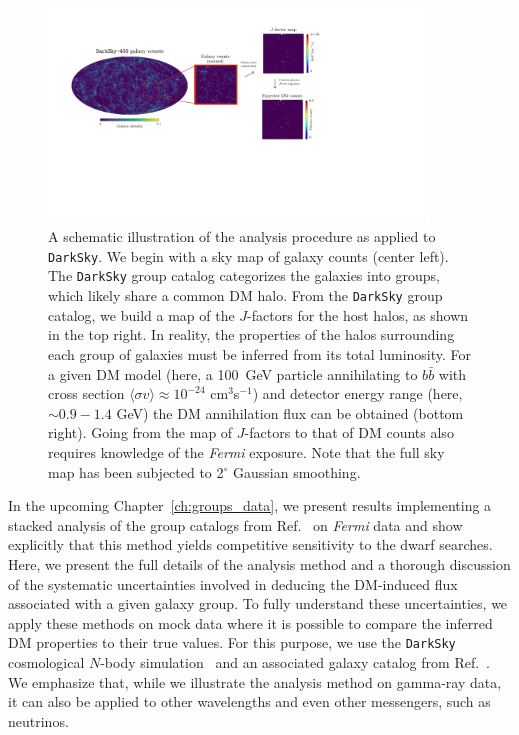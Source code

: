 \begin{figure}[htbp]
   \centering
   \includegraphics[width=0.9\textwidth]{ch-darksky/plots//DarkSky-galaxies.pdf}
   \caption{A schematic illustration of the analysis procedure as applied to \texttt{DarkSky}.   We begin with a sky map of galaxy counts (center left).  The \texttt{DarkSky} group catalog categorizes the galaxies into groups, which likely share a common DM halo.  From the \texttt{DarkSky} group catalog, we build a map of the $J$-factors for the host halos, as shown in the top right.  In reality, the properties of the halos surrounding each group of galaxies must be inferred from its total luminosity.  For a given DM model (here, a 100~GeV particle annihilating to $b\bar{b}$ with cross section $\langle \sigma v \rangle \approx 10^{-24}$ cm$^3$s$^{-1}$) and detector energy range (here, $\sim0.9-1.4$ GeV) the DM annihilation flux can be obtained (bottom right).  Going from the map of $J$-factors to that of DM counts also requires knowledge of the \emph{Fermi} exposure. Note that the full sky map has been subjected to 2$^{\circ}$ Gaussian smoothing.}
   \label{fig:DarkSkycounts}
\end{figure}

In the upcoming Chapter~\ref{ch:groups_data}, we present results implementing a stacked analysis of the group catalogs from Ref.~\cite{Tully:2015opa,2017ApJ...843...16K} on \emph{Fermi} data and show explicitly that this method yields competitive sensitivity to the dwarf searches.  Here, we present the full details of the analysis method and a thorough discussion of the systematic uncertainties involved in deducing the DM-induced flux associated with a given galaxy group.  To fully understand these uncertainties, we apply these methods on mock data where it is possible to compare the inferred DM properties to their true values.  For this purpose, we use the \texttt{DarkSky} cosmological $N$-body simulation~\cite{Skillman:2014qca,Lehmann:2015ioa} and an associated galaxy catalog from Ref.~\cite{Lehmann:2015ioa}.  We emphasize that, while we illustrate the analysis method on gamma-ray data, it can also be applied to other wavelengths and even other messengers, such as neutrinos.  

